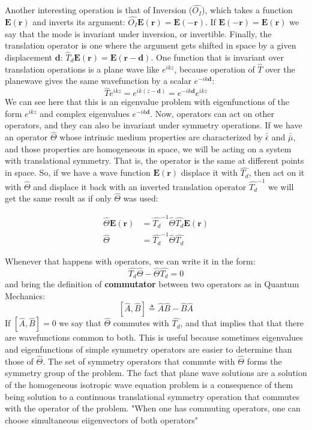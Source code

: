 Another interesting operation is that of Inversion ($\hat{O_I}$), which takes a function $\mathbf{E(r)}$ and inverts its argument: $\hat{O_I}\mathbf{E(r)} = \mathbf{E(-r)}$. If $\mathbf{E(-r)}=\mathbf{E(r)}$ we say that the mode is invariant under inversion, or invertible.
Finally, the translation operator is one where the argument gets shifted in space by a given displacement $\mathbf{d}$: $\hat{T}_d\mathbf{E(r)} = \mathbf{E(r-d)}$. 
One function that is invariant over translation operations is a plane wave like $e^{ikz}$, because operation of $\hat{T}$ over the planewave gives the same wavefunction by a scalar $e^{-ik\mathbf{d}}$:
$$\hat{T}e^{ikz} = e^{ik(z-\mathbf{d})} = e^{-ik\mathbf{d}}e^{ikz}$$
We can see here that this is an eigenvalue problem with eigenfunctions of the form  $e^{ikz}$ and complex eigenvalues $e^{-ik\mathbf{d}}$.
Now, operators can act on other operators, and they can also be invariant under symmetry operations. If we have an operator $\hat{\Theta}$ whose intrinsic medium properties are characterized by $\bar{\bar{\epsilon}}$ and $\bar{\bar{\mu}}$, and those properties are homogeneous in space, we will be acting on a system with translational symmetry. That is, the operator is the same at different points in space.
So, if we have a wave function $\mathbf{E(r)}$ displace it with $\hat{T_d}$, then act on it with $\hat{\Theta}$ and displace it back with an inverted translation operator $\hat{T_d}^{-1}$ we will get the same result as if only $\hat{\Theta}$ was used:

\begin{align*}
\hat{\Theta}\mathbf{E(r)} &= \hat{T_d}^{-1}\hat{\Theta}\hat{T_d}\mathbf{E(r)}\\
\hat{\Theta} &= \hat{T_d}^{-1}\hat{\Theta}\hat{T_d}
\end{align*}

Whenever that happens with operators, we can write it in the form: $$\hat{T_d}\hat{\Theta}-\hat{\Theta}\hat{T_d}=0$$
and bring the definition of \textbf{commutator} between two operators as in Quantum Mechanics: 
\begin{equation}
\left[\hat{A},\hat{B}\right] \triangleq \hat{A}\hat{B}-\hat{B}\hat{A}
\label{eq:commutator}
\end{equation}
If $\left[\hat{A},\hat{B}\right] = 0$ we say that $\hat{\Theta}$ commutes with $\hat{T_d}$, and that implies that that there are wavefunctions common to both.
This is useful because sometimes eigenvalues and eigenfunctions of simple symmetry operators are easier to determine than those of $\hat{\Theta}$.  
The set of symmetry operators that commute with $\hat{\Theta}$ forms the symmetry group of the problem.  
The fact that plane wave solutions are a solution of the homogeneous isotropic wave equation problem is a consequence of them being solution to a continuous translational symmetry operation that commutes with the operator of the problem.
"When one has commuting operators, one can choose simultaneous eiigenvectors of both operators" \cite	{Joannopoulos2008}


